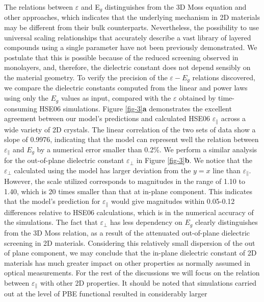 \documentclass[journal=ancac3,manuscript=article,email=true,hyperref=true,keywords=true]{achemso}
\begin{document}
The relations between $\varepsilon$ and E$_{g}$
distinguishes from the 3D Moss equation and other approaches\cite{Ravindra_1979_eps_Eg,Ravindra_1980_model,Ravindra_2007_Eg_rev},  
which indicates that the underlying mechanism in 2D
materials may be different from their bulk counterparts. 
Nevertheless, the possibility to use universal scaling relationships
that accurately describe a vast library of layered compounds using 
a single parameter have not been previously demonstrated. We postulate 
that this is possible because of the reduced screening observed in monolayers, and,
therefore, the dielectric constant does not depend sensibly 
on the material geometry. 
To verify the precision of the $\varepsilon-E_{g}$ relations
discovered, we compare the dielectric constants computed from the
linear and power laws using only the \(E_{g}\) values as input, compared with
the \(\varepsilon\) obtained by time-consuming HSE06 simulations. 
Figure \ref{fig-3}{\bf a} demonstrates the excellent agreement between our 
model's predictions and calculated HSE06 \(\varepsilon_{\parallel}\) across a wide variety of 
2D crystals. The linear correlation of the two sets of
data show a slope of 0.9976, indicating that the model can 
represent well the relation between \(\varepsilon_{\parallel}\) and
\(E_{g}\) by a numerical error smaller than 0.2\%. 
We perform a similar analysis for the out-of-plane
dielectric constant $\varepsilon_{\perp}$ in Figure \ref{fig-3}{\bf b}. 
We notice that the \(\varepsilon_{\perp}\) calculated
using the model has larger deviation from the \(y=x\) line than
\(\varepsilon_{\parallel}\). However, the scale utilized corresponds to magnitudes 
in the range of 1.10 to 1.40, which is 20 times smaller than that at in-plane component. 
This indicates that the model's prediction for \(\varepsilon_{\parallel}\) would give magnitudes within 0.05-0.12 differences relative to HSE06 calculations, 
which is in the numerical accuracy of the simulations. 
The fact that \(\varepsilon_{\perp}\) has
less dependency on \(E_{g}\) clearly distinguishes from the 3D
Moss relation, as a result of the attenuated out-of-plane dielectric
screening in 2D materials. 
Considering this relatively small dispersion
of the out of plane component, we may
conclude that the in-plane dielectric constant of 2D materials has
much greater impact on other properties as normally assumed in 
optical measurements\cite{Chernikov_2014_EB_MoS2_2D3D}. 
For the rest of the discussions we
will focus on the relation between \(\varepsilon_{\parallel}\) with other
2D properties.
It should be noted that simulations carried out at the level of PBE functional resulted in considerably larger 
\end{document}
